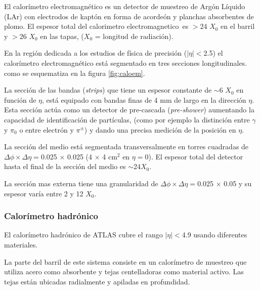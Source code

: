 El calorímetro electromagnético es un detector de muestreo de Argón Líquido
(LAr) con electrodos de kaptón en forma de acordeón y planchas absorbentes de
plomo. El espesor total del calorimetro electromagnetico\ es $>$24 $X_0$ en el
barril y $>$26 $X_0$ en las tapas, ($X_0$ = longitud de radiación).

En la región dedicada a los estudios de física de precisión ($|\eta|<$2.5) el
calorímetro electromagnético está segmentado en tres secciones longitudinales.%
como se esquematiza en la figura \ref{fig:caloem}.



La sección de las bandas (\emph{strips}) que tiene un espesor constante de
$\sim$6 $X_0$ en función de $\eta$, está equipado con bandas finas de 4 mm de
largo en la dirección $\eta$. Esta sección actúa como un detector de pre-cascada
(\emph{pre-shower}) aumentando la capacidad de identificación de partículas,
(como por ejemplo la distinción entre $\gamma$ y $\pi_0$ o entre electrón y
$\pi^\pm$) y dando una precisa medición de la posición en $\eta$.

La sección del medio está segmentada transversalmente en torres cuadradas de
$\Delta \phi \times \Delta \eta=$0.025 $\times$ 0.025 (4 $\times$ 4 cm$^2$ en
$\eta=0$). El espesor total del detector hasta el final de la sección del medio
es $\sim$24$X_0$.

La sección mas externa tiene una granularidad de
$\Delta\phi\times\Delta\eta=$0.025 $\times$ 0.05 y su espesor varía entre 2 y 12
$X_0$.

\subsubsection{Calorímetro hadrónico}
El calorímetro hadrónico de ATLAS \cite{calohadTDR} cubre el rango $|\eta|<$4.9
usando diferentes materiales.

La parte del barril de este sistema consiste en un calorímetro de muestreo que
utiliza acero como absorbente y tejas centelladoras como material activo. Las
tejas están ubicadas radialmente y apiladas en profundidad.


